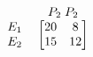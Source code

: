\documentclass{article}
\begin{document}
	$
	\begin{array}{cc}
		& \begin{array}{r@{\;}l}
			P_2 & P_2
		\end{array} \\
		\begin{array}{r@{\;}l}
			E_1 \\ E_2
		\end{array} &
		\begin{bmatrix}
			20 & 8 \\ 15 & 12
		\end{bmatrix}
	\end{array}
	$
\end{document}
